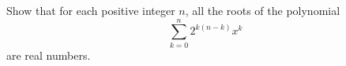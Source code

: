 Show that for each positive integer $n$, all the roots of the polynomial
\[
\sum_{k=0}^n 2^{k(n-k)} x^k
\]
are real numbers.

